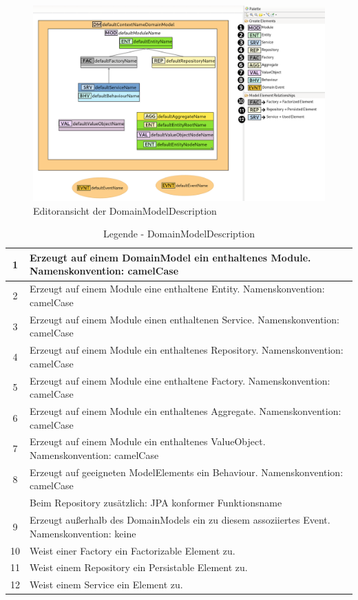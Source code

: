 \begin{figure}[ht]
\centering
\includegraphics[width=\textwidth]{bilder/k5/2.png}
\caption{Editoransicht der DomainModelDescription}
\end{figure}


\begin{table}[h]
\centering
\footnotesize
\begin{tabularx}{\textwidth}{|c|X|}
\hline
1 & Erzeugt auf einem DomainModel ein enthaltenes Module. Namenskonvention: camelCase \\ \hline
2 & Erzeugt auf einem Module eine enthaltene Entity. Namenskonvention: camelCase \\ \hline
3 & Erzeugt auf einem Module einen enthaltenen Service. Namenskonvention: camelCase \\ \hline
4 & Erzeugt auf einem Module ein enthaltenes Repository. Namenskonvention: camelCase \\ \hline
5 & Erzeugt auf einem Module eine enthaltene Factory. Namenskonvention: camelCase \\ \hline
6 & Erzeugt auf einem Module ein enthaltenes Aggregate. Namenskonvention: camelCase \\ \hline
7 & Erzeugt auf einem Module ein enthaltenes ValueObject. Namenskonvention: camelCase \\ \hline
8 & Erzeugt auf geeigneten ModelElements ein Behaviour. Namenskonvention: camelCase \\ & Beim Repository zusätzlich: JPA konformer Funktionsname \\ \hline
9 & Erzeugt außerhalb des DomainModels ein zu diesem assoziiertes Event. Namenskonvention: keine \\ \hline
10 & Weist einer Factory ein Factorizable Element zu. \\ \hline
11 & Weist einem Repository ein Persistable Element zu. \\ \hline
12 & Weist einem Service ein Element zu. \\ \hline
\end{tabularx}
\caption{Legende - DomainModelDescription}
\end{table}

